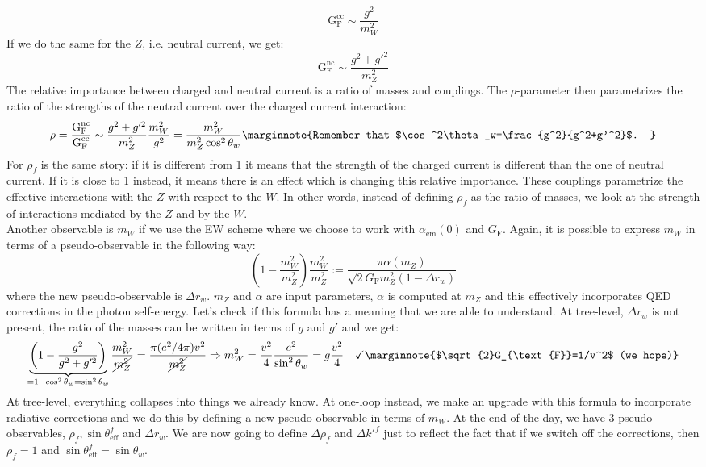 \documentclass[../main.tex]{subfiles}
\begin{document}
\[
\text{G}_{\text{F}}^{\text{cc}}\sim\frac{g^2}{m_W^2}
\]
If we do the same for the $Z$, i.e. neutral current, we get:
\[
\text{G}_{\text{F}}^{\text{nc}}\sim\frac{g^2+g'^2}{m_Z^2}
\]
The relative importance between charged and neutral current is a ratio of masses and couplings. The $\rho$-parameter then parametrizes the ratio of the strengths of the neutral current over the charged current interaction:
\[
\rho=\frac{\text{G}_{\text{F}}^{\text{nc}}}{\text{G}_{\text{F}}^{\text{cc}}}\sim\frac{g^2+g'^2}{m_Z^2}\frac{m_W^2}{g^2}=\frac{m_W^2}{m_Z^2\cos^2\theta_w}\marginnote{Remember that $\cos^2\theta_w=\frac{g^2}{g^2+g'^2}$.
}
\]
For $\rho_f$ is the same story: if it is different from 1 it means that the strength of the charged current is different than the one of neutral current. If it is close to 1 instead, it means there is an effect which is changing this relative importance. These couplings parametrize the 
effective interactions with the $Z$ with respect to the $W$. In other words, instead of defining $\rho_f$ as the ratio of masses, we look at the strength of interactions mediated by the $Z$ and by the $W$.\\
Another observable is $m_W$ if we use the EW scheme where we choose to work with $\alpha_{\text{em}}(0)$ and $G_{\text{F}}$. Again, it is possible to express $m_W$ in terms of a pseudo-observable in the following way:
\[
\left(1-\frac{m_W^2}{m_Z^2}\right)\frac{m_W^2}{m_Z^2}:=\frac{\pi\alpha(m_Z)}{\sqrt{2}G_{\text{F}}m_Z^2(1-\Delta r_w)}
\]
where the new pseudo-observable is $\Delta r_w$. $m_Z$ and $\alpha$ are input parameters, $\alpha$ is computed at $m_Z$ and this effectively incorporates QED corrections in the photon self-energy. Let's check if this formula has a meaning that we are able to understand. At tree-level, $\Delta r_w$ is not present, the ratio of the masses can be written in terms of $g$ and $g'$ and we get:
\[
\underbrace{\left(1-\frac{g^2}{g^2+g'^2}\right)}_{=1-\cos^2\theta_w=\sin^2\theta_w}\frac{m_W^2}{\cancel{m_Z^2}}=\frac{\pi(e^2/4\pi) v^2}{\cancel{m_Z^2}}\Rightarrow m_W^2=\frac{v^2}{4}\frac{e^2}{\sin^2\theta_w}=g\frac{v^2}{4} \quad \checkmark\marginnote{$\sqrt{2}G_{\text{F}}=1/v^2$ (we hope)}
\]
At tree-level, everything collapses into things we already know. At one-loop instead, we make an upgrade with this formula to incorporate radiative corrections and we do this by defining a new pseudo-observable in terms of $m_W$. At the end of the day, we have 3 pseudo-observables, $\rho_f, \sin\theta_{\text{eff}}^f$ and $\Delta r_w$. We are now going to define $\Delta\rho_f$ and $\Delta k'^f$ just to reflect the fact that if we switch off the corrections, then $\rho_f=1$ and $\sin\theta_{\text{eff}}^f=\sin\theta_w$.
\end{document}

